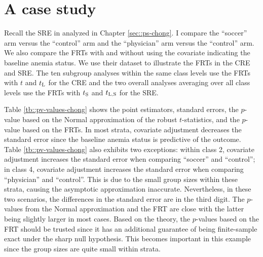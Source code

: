 \section{A case study}
\label{sec::case-study-chong}

 

Recall the SRE in \citet{chong2016iron} analyzed in Chapter \ref{sec::ps-chong}. 
I compare the ``soccer'' arm versus the ``control'' arm and the ``physician'' arm versus the ``control'' arm. We also compare the FRTs with and without using the covariate indicating the baseline anemia status. We use their dataset to illustrate the FRTs in the CRE and SRE.  The ten subgroup analyses within the same class levels use the FRTs with $t$ and $t_\textsc{L}$ for the CRE and the two overall analyses averaging over all class levels use the FRTs with $t_\textsc{S}$ and $t_\textsc{L,S}$ for the SRE. 

Table \ref{tb::pv-values-chong} shows the point estimators, standard errors, the $p$-value based on the Normal approximation of the robust $t$-statistics, and the $p$-value based on the FRTs. In most strata, covariate adjustment decreases the standard error since the baseline anemia status is predictive of the outcome. Table \ref{tb::pv-values-chong} also exhibits two exceptions: within class 2, covariate adjustment increases the standard error when comparing ``soccer'' and ``control''; in class 4, covariate adjustment increases the standard error when comparing ``physician'' and ``control''. This is due to the small group sizes within these strata, causing the asymptotic approximation inaccurate. Nevertheless, in these two scenarios, the differences in the standard error are in the third digit.  The $p$-values from the Normal approximation and the FRT are close with the latter being slightly larger in most cases. Based on the theory, the $p$-values based on the FRT should be trusted since it has an additional guarantee of being finite-sample exact under the sharp null hypothesis. This becomes important in this example since the group sizes are quite small within strata. 


